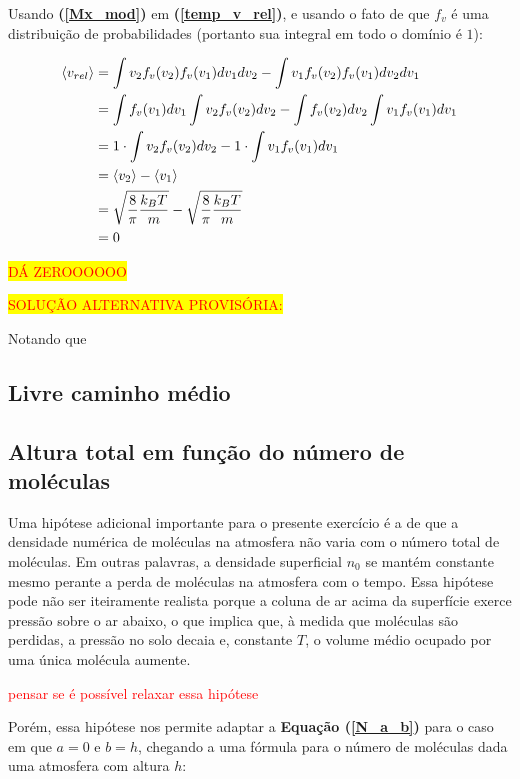 \documentclass[12pt]{extarticle} %
\begin{document}
Usando \textbf{(\ref{Mx_mod})} em \textbf{(\ref{temp_v_rel})}, e usando o fato de que $f_v$ é uma distribuição de probabilidades (portanto sua integral em todo o domínio é $1$):

\begin{align}
    \langle v_{rel} \rangle &= \int v_2 f_v(v_2) f_v(v_1) dv_1 dv_2 - \int v_1 f_v(v_2) f_v(v_1) dv_2 dv_1 \notag \\
    &= \int f_v(v_1) dv_1 \int v_2 f_v(v_2) dv_2 - \int f_v(v_2) dv_2 \int v_1 f_v(v_1) dv_1 \notag \\
    &= 1 \cdot \int v_2 f_v(v_2) dv_2 - 1 \cdot \int v_1 f_v(v_1) dv_1 \notag \\
    &= \langle v_2 \rangle - \langle v_1 \rangle \notag \\
    &= \sqrt{\frac{8}{\pi}\frac{k_BT}{m}} - \sqrt{\frac{8}{\pi}\frac{k_BT}{m}} \notag \\
    &= 0
\end{align}

\colorbox{yellow}{\textcolor{red}{DÁ ZEROOOOOO}}

\colorbox{yellow}{\textcolor{red}{SOLUÇÃO ALTERNATIVA PROVISÓRIA:}}

Notando que



\subsection{Livre caminho médio}

\subsection{Altura total em função do número de moléculas}

Uma hipótese adicional importante para o presente exercício é a de que a densidade numérica de moléculas na atmosfera não varia com o número total de moléculas. Em outras palavras, a densidade superficial $n_0$ se mantém constante mesmo perante a perda de moléculas na atmosfera com o tempo. Essa hipótese pode não ser iteiramente realista porque a coluna de ar acima da superfície exerce pressão sobre o ar abaixo, o que implica que, à medida que moléculas são perdidas, a pressão no solo decaia e, constante $T$, o volume médio ocupado por uma única molécula aumente.

\textcolor{red}{pensar se é possível relaxar essa hipótese}

Porém, essa hipótese nos permite adaptar a \textbf{Equação (\ref{N_a_b})} para o caso em que $a=0$ e $b=h$, chegando a uma fórmula para o número de moléculas dada uma atmosfera com altura $h$:
\end{document}
